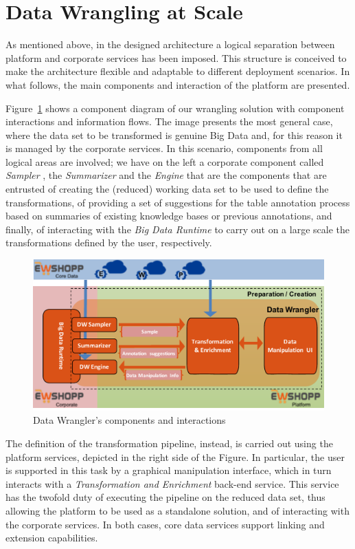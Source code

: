 \section{Data Wrangling at Scale}\label{sec:architecture}
As mentioned above, in the designed architecture a logical separation between  platform and corporate services has been imposed. This structure is conceived to make the architecture flexible and adaptable to different deployment scenarios. 
In what follows, the main components and interaction of the platform are presented. 

Figure~\ref{fig:wrangler} shows a component diagram of our wrangling solution with component interactions and information flows. 
The image presents the most general case, where the data set to be transformed is genuine Big Data and, for this reason it is managed by the corporate services. 
In this scenario, components from all logical areas are involved; we have on the left a corporate component called \textit{Sampler} , the \textit{Summarizer} and the \textit{Engine} that are the components that are entrusted of creating the (reduced) working data set to be used to define the transformations, of providing a set of suggestions for the table annotation process based on summaries of existing knowledge bases or previous annotations, and finally, of interacting with the \textit{Big Data Runtime} to carry out on a large scale the transformations defined by the user, respectively. 
\begin{figure}[t]
    \centering
    \includegraphics[width=\columnwidth]{figs/Wrangler.pdf}
    \caption{Data Wrangler's components and interactions}
    \label{fig:wrangler} 
\end{figure}  
The definition of the transformation pipeline, instead, is carried out using the platform services, depicted in the right side of the Figure. In particular, the user is supported in this task by a graphical manipulation interface, which in turn interacts with a \textit{Transformation and Enrichment} back-end service. This service has the twofold duty of executing the pipeline on the reduced data set, thus allowing the platform to be used as a standalone solution, and of interacting with the corporate services. In both cases, core data services support linking and extension capabilities. 

